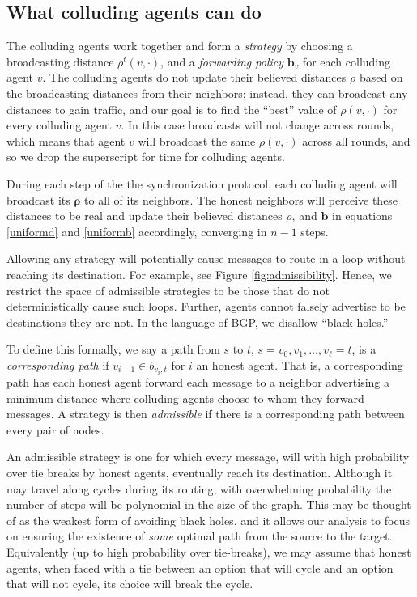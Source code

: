 \documentclass{comnet}
\begin{document}
\subsection{What colluding agents can do}
\label{sec:uniform-nonuniform-models}

The colluding agents work together and form a \emph{strategy} by choosing a
broadcasting distance $\rho^t(v,\cdot)$,  and a {\it forwarding policy}
$\mathbf{b}_{v}$ for each colluding agent $v$. The colluding agents do not
update their believed distances $\rho$ based on the broadcasting distances from
their neighbors; instead, they can broadcast any distances to gain traffic, and
our goal is to find the ``best'' value of $\rho(v,\cdot)$ for every colluding
agent $v$. In this case broadcasts will not change across rounds, which means
that agent $v$ will broadcast the same $\rho(v,\cdot)$  across all rounds, and
so we drop the superscript for time for colluding agents.  

During each step of the the synchronization protocol, each colluding agent will
broadcast its $\mathbf{\rho}$ to all of its neighbors. The honest neighbors
will perceive these distances to be real and update their believed distances
$\rho$, and $\mathbf{b}$ in equations \ref{uniformd} and \ref{uniformb}
accordingly, converging in $n-1$ steps. 

Allowing any strategy will potentially cause messages to route in a loop
without reaching its destination. For example, see Figure
\ref{fig:admissibility}. Hence, we restrict the space of admissible strategies
to be those that do not deterministically cause such loops. Further, agents
cannot falsely advertise to be destinations they are not. In the language of
BGP, we disallow ``black holes.'' 

To define this formally, we say a path from $s$ to $t$, $s= v_0, v_1, \ldots,
v_{\ell} = t$, is a {\it corresponding path} if $v_{i+1} \in b_{v_i,t}$ for
$i$ an honest agent. That is, a corresponding path has each honest agent
forward each message to a neighbor advertising a minimum distance where
colluding agents choose to whom they forward messages. A strategy is then
\emph{admissible} if there is a corresponding path between every pair of nodes.  

An admissible strategy is one for which every message, will with high
probability over tie breaks by honest agents, eventually reach its destination.
Although it may travel along cycles during its routing, with overwhelming
probability the number of steps will be polynomial in the size of the graph.
This may be thought of as the weakest form of avoiding black holes, and it
allows our analysis to focus on ensuring the existence of \emph{some} optimal
path from the source to the target. Equivalently (up to high probability over
tie-breaks), we may assume that honest agents, when faced with a tie between an
option that will cycle and an option that will not cycle, its choice will break
the cycle.
\end{document}
